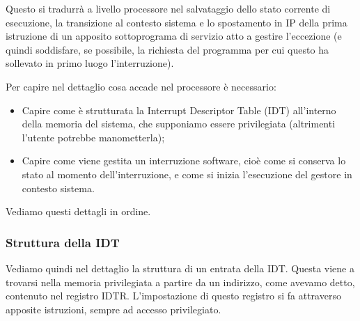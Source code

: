 \documentclass[a4paper,11pt]{article}
\begin{document}
Questo si tradurrà a livello processore nel salvataggio dello stato corrente di esecuzione, la transizione al contesto sistema e lo spostamento in IP della prima istruzione di un apposito sottoprograma di servizio atto a gestire l'eccezione (e quindi soddisfare, se possibile, la richiesta del programma per cui questo ha sollevato in primo luogo l'interruzione).

Per capire nel dettaglio cosa accade nel processore è necessario:
\begin{itemize}
	\item Capire come è strutturata la Interrupt Descriptor Table (IDT) all'interno della memoria del sistema, che supponiamo essere privilegiata (altrimenti l'utente potrebbe manometterla);
	\item Capire come viene gestita un interruzione software, cioè come si conserva lo stato al momento dell'interruzione, e come si inizia l'esecuzione del gestore in contesto sistema.
\end{itemize}

Vediamo questi dettagli in ordine.

\subsubsection{Struttura della IDT}
Vediamo quindi nel dettaglio la struttura di un entrata della IDT.
Questa viene a trovarsi nella memoria privilegiata a partire da un indirizzo, come avevamo detto, contenuto nel registro IDTR.
L'impostazione di questo registro si fa attraverso apposite istruzioni, sempre ad accesso privilegiato.
\end{document}
